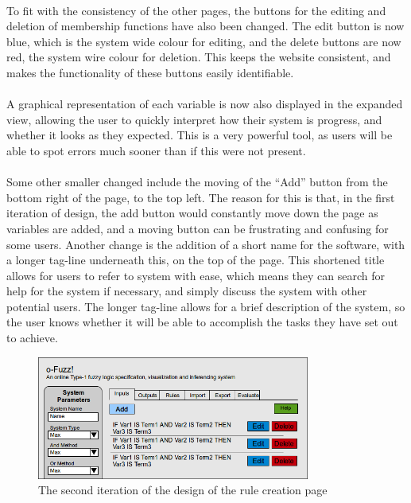 \ \\
To fit with the consistency of the other pages, the buttons for the editing and deletion of membership functions have also been changed. The edit button is now blue, which is the system wide colour for editing, and the delete buttons are now red, the system wire colour for deletion. This keeps the website consistent, and makes the functionality of these buttons easily identifiable.\ \\
\ \\
A graphical representation of each variable is now also displayed in the expanded view, allowing the user to quickly interpret how their system is progress, and whether it looks as they expected. This is a very powerful tool, as users will be able to spot errors much sooner than if this were not present.\ \\
\ \\
Some other smaller changed include the moving of the ``Add'' button from the bottom right of the page, to the top left. The reason for this is that, in the first iteration of design, the add button would constantly move down the page as variables are added, and a moving button can be frustrating and confusing for some users. Another change is the addition of a short name for the software, with a longer tag-line underneath this, on the top of the page. This shortened title allows for users to refer to system with ease, which means they can search for help for the system if necessary, and simply discuss the system with other potential users. The longer tag-line allows for a brief description of the system, so the user knows whether it will be able to accomplish the tasks they have set out to achieve.


\begin{figure}[ht!]
\begin{center}
\includegraphics[width=0.8\textwidth]{images/secondItRules}
\end{center}
\caption{The second iteration of the design of the rule creation page}
\label{fig:design-secondIterationRules}
\end{figure}

